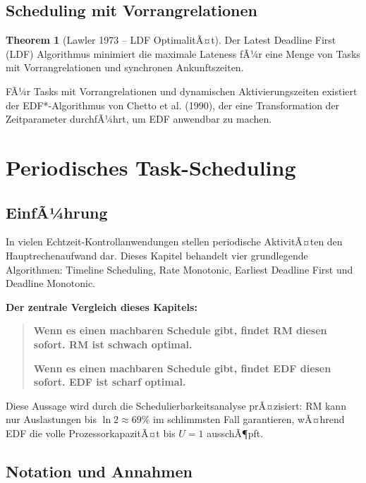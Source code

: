 ﻿\documentclass[a4paper,12pt]{report}
\theoremstyle{definition}
\newtheorem{theorem}{Theorem}[chapter]
\begin{document}
\section{Scheduling mit Vorrangrelationen}

\begin{theorem}[Lawler 1973 -- LDF OptimalitÃ¤t]
	Der Latest Deadline First (LDF) Algorithmus minimiert die maximale Lateness
	fÃ¼r eine Menge von Tasks mit Vorrangrelationen und synchronen Ankunftszeiten.
\end{theorem}

FÃ¼r Tasks mit Vorrangrelationen und dynamischen Aktivierungszeiten existiert der
EDF*-Algorithmus von Chetto et al. (1990), der eine Transformation der
Zeitparameter durchfÃ¼hrt, um EDF anwendbar zu machen.

\chapter{Periodisches Task-Scheduling}
\label{chap:periodisch}

\section{EinfÃ¼hrung}

In vielen Echtzeit-Kontrollanwendungen stellen periodische AktivitÃ¤ten den
Hauptrechenaufwand dar. Dieses Kapitel behandelt vier grundlegende Algorithmen:
Timeline Scheduling, Rate Monotonic, Earliest Deadline First und Deadline Monotonic.

\textbf{Der zentrale Vergleich dieses Kapitels:}

\begin{quote}
\textbf{Wenn es einen machbaren Schedule gibt, findet RM diesen sofort. RM ist schwach optimal.}

\textbf{Wenn es einen machbaren Schedule gibt, findet EDF diesen sofort. EDF ist scharf optimal.}
\end{quote}

Diese Aussage wird durch die Schedulierbarkeitsanalyse prÃ¤zisiert: RM kann nur
Auslastungen bis $\ln 2 \approx 69\%$ im schlimmsten Fall garantieren, wÃ¤hrend
EDF die volle ProzessorkapazitÃ¤t bis $U = 1$ ausschÃ¶pft.

\section{Notation und Annahmen}
\end{document}
